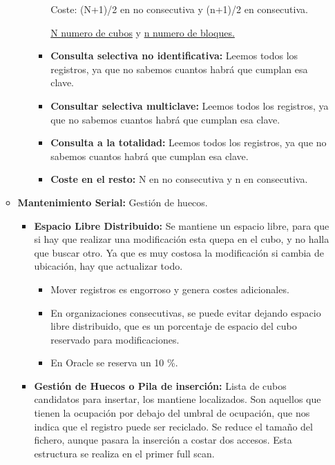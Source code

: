 \documentclass[12pt, twoside, openright]{report} %
\begin{document}
\begin{itemize}
\begin{itemize}
\begin{itemize}
\begin{itemize}
        
		  
            Coste: (N+1)/2 en no consecutiva y (n+1)/2 en consecutiva.
           
			
            \underline{N numero de cubos} y \underline{n numero de
            bloques.}
      
			
        \item \textbf{Consulta selectiva no identificativa:} Leemos todos
          los registros, ya que no sabemos cuantos habrá que cumplan esa
          clave.
          
        \item \textbf{Consultar selectiva multiclave:} Leemos todos los
          registros, ya que no sabemos cuantos habrá que cumplan esa
          clave.
          
        \item \textbf{Consulta a la totalidad:} Leemos todos los registros,
          ya que no sabemos cuantos habrá que cumplan esa clave.
          
        \item \textbf{Coste en el resto:} N en no consecutiva y n en
          consecutiva.
          
        \end{itemize}
      \end{itemize}
    \item \textbf{Mantenimiento Serial:} Gestión de huecos.
      

      \begin{itemize}
      \item \textbf{Espacio Libre Distribuido:} Se mantiene un espacio
        libre, para que si hay que realizar una modificación esta quepa
        en el cubo, y no halla que buscar otro. Ya que es muy costosa la
        modificación si cambia de ubicación, hay que actualizar todo.
        

        \begin{itemize}
        \item Mover registros es engorroso y genera costes adicionales.
          
        \item En organizaciones consecutivas, se puede evitar dejando
          espacio libre distribuido, que es un porcentaje de espacio del
          cubo reservado para modificaciones.
          
        \item En Oracle se reserva un 10 \%.
          
        \end{itemize}
      \item \textbf{Gestión de Huecos o Pila de inserción:} Lista de cubos
        candidatos para insertar, los mantiene localizados. Son aquellos
        que tienen la ocupación por debajo del umbral de ocupación, que
        nos indica que el registro puede ser reciclado. Se reduce el
        tamaño del fichero, aunque pasara la inserción a costar dos
        accesos. Esta estructura se realiza en el primer full scan.
        

\end{itemize}
\end{itemize}
\end{itemize}
\end{document}

